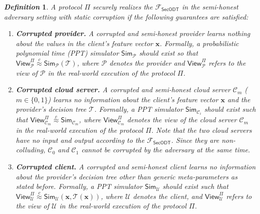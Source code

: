 \documentclass[10pt,journal,compsoc]{IEEEtran}
\newtheorem{definition}{\textbf{\emph{Definition}}}
\begin{document}
\begin{definition}
\label{def:security-def}
A protocol $\Pi$ securely realizes the $\mathcal{F}_{\mathsf{SecODT}}$ in the semi-honest adversary setting with static corruption if the following guarantees are satisfied:

\begin{enumerate}[-]

\item \textbf{Corrupted provider.} A corrupted and semi-honest provider learns nothing about the values in the client's feature vector $\mathbf{x}$. Formally, a probabilistic polynomial time (PPT) simulator $\mathsf{Sim}_{\mathcal{P}}$ should exist so that $\mathsf{View}^{\Pi}_{\mathcal{P}} \mathop  \approx \limits^c \mathsf{Sim}_{\mathcal{P}}(\mathcal{T})$, where $\mathcal{P}$ denotes the provider and $\mathsf{View}^{\Pi}_{\mathcal{P}}$ refers to the view of $\mathcal{P}$ in the real-world execution of the protocol $\Pi$.


\item \textbf{Corrupted cloud server.} A corrupted and semi-honest cloud server $\mathcal{C}_m$ ($m\in\{0,1\}$) learns no information about the client's feature vector $\mathbf{x}$ and the provider's decision tree $\mathcal{T}$. Formally, a PPT simulator $\mathsf{Sim}_{\mathcal{C}_i}$ should exist such that $\mathsf{View}^{\Pi}_{\mathcal{C}_m} \mathop  \approx \limits^c \mathsf{Sim}_{\mathcal{C}_m}$, where $\mathsf{View}^{\Pi}_{\mathcal{C}_m}$ denotes the view of the cloud server $\mathcal{C}_m$ in the real-world execution of the protocol $\Pi$.
%
Note that the two cloud servers have no input and output according to the $\mathcal{F}_{\mathsf{SecODT}}$. Since they are non-colluding, $\mathcal{C}_0$ and $\mathcal{C}_1$ cannot be corrupted by the adversary at the same time. 

\item \textbf{Corrupted client.} A corrupted and semi-honest client learns no information about the provider's decision tree other than generic meta-parameters as stated before. Formally, a PPT simulator $\mathsf{Sim}_{\mathcal{U}}$ should exist such that $\mathsf{View}^{\Pi}_{\mathcal{U}} \mathop  \approx \limits^c \mathsf{Sim}_{\mathcal{U}}(\mathbf{x},\mathcal{T}(\mathbf{x}))$, where $\mathcal{U}$ denotes the client, and $\mathsf{View}^{\Pi}_{\mathcal{U}}$ refers to the view of $\mathcal{U}$ in the real-world execution of the protocol $\Pi$.


\end{enumerate}
\end{definition}
\end{document}
